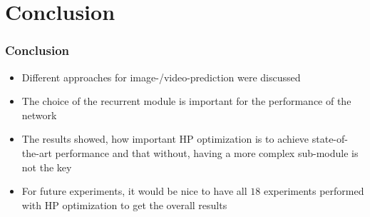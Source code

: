 \section{Conclusion} 
 \begin{frame}
  \frametitle{Conclusion}
  
  \begin{itemize}
   \item<1-> Different approaches for image-/video-prediction were discussed
   \item<2-> The choice of the recurrent module is important for the performance of the network
   \item<3-> The results showed, how important HP optimization is to achieve state-of-the-art performance and that without, having a more complex sub-module
   is not the key
   \item<4-> For future experiments, it would be nice to have all $18$ experiments performed with HP optimization to get the overall results
  \end{itemize}

 \end{frame}